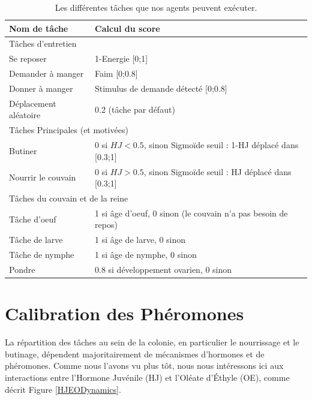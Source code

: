 		\begin{table}
        \centering
        \caption{Les différentes tâches que nos agents peuvent exécuter.}
        \begin{tabular}{|l|l|}
            \hline
            Nom de tâche & Calcul du score\\
            \hline
            \hline
            \multicolumn{2}{|l|}{Tâches d'entretien}\\
            \hline
            Se reposer & 1-Energie [0;1]\\
            Demander à manger & Faim [0;0.8] \\
            Donner à manger & Stimulus de demande détecté [0;0.8] \\
            Déplacement aléatoire & 0.2 (tâche par défaut) \\
            \hline
            \hline
            \multicolumn{2}{|l|}{Tâches Principales (et motivées)}\\
            \hline
            Butiner & 0 si $HJ<0.5$, sinon Sigmoïde seuil : 1-HJ déplacé dans [0.3;1] \\
            Nourrir le couvain & 0 si $HJ>0.5$, sinon Sigmoïde seuil : HJ déplacé dans [0.3;1] \\
            \hline
            \hline
            \multicolumn{2}{|l|}{Tâches du couvain et de la reine}\\
            \hline
            Tâche d'oeuf & 1 si âge d'oeuf, 0 sinon (le couvain n'a pas besoin de repos)\\
            Tâche de larve & 1 si âge de larve, 0 sinon\\
            Tâche de nymphe & 1 si âge de nymphe, 0 sinon \\
            Pondre & 0.8 si développement ovarien, 0 sinon\\
            \hline
            
        \end{tabular}
        \label{tableTasks}
    \end{table}
    
	\section{Calibration des Phéromones}
	
	La répartition des tâches au sein de la colonie, en particulier le nourrissage et le butinage, dépendent majoritairement de mécanismes d'hormones et de phéromones. Comme nous l'avons vu plus tôt, nous nous intéressons ici aux interactions entre l'Hormone Juvénile (HJ) et l'Oléate d'Éthyle (OE), comme décrit Figure \ref{HJEODynamics}.
	
